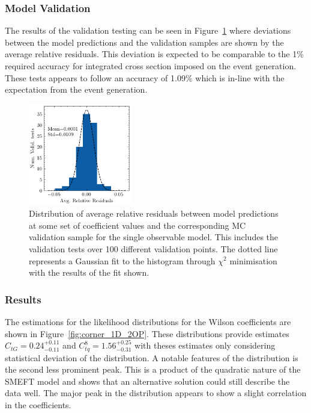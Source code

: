 \documentclass[a4paper,11pt]{article}
\begin{document}
\subsubsection{Model Validation}

The results of the validation testing can be seen in Figure~\ref{fig:residuals_hist_1D} where deviations between the model predictions and the validation samples are shown by the average relative residuals.
This deviation is expected to be comparable to the 1\% required accuracy for integrated cross section imposed on the event generation.
These tests appears to follow an accuracy of 1.09\% which is in-line with the expectation from the event generation.

\begin{figure}[htb]
    \centering
    \includegraphics[width=0.4\textwidth]{./plots/residuals_hist_1D.png}
    \caption{Distribution of average relative residuals between model predictions at some set of coefficient values and the corresponding MC validation sample for the single observable model. This includes the validation tests over 100 different validation points. The dotted line represents a Gaussian fit to the histogram through $\chi^2$ minimisation with the results of the fit shown.}
    \label{fig:residuals_hist_1D}
\end{figure}
\subsubsection{Results}

The estimations for the likelihood distributions for the Wilson coefficients are shown in Figure~\ref{fig:corner_1D_2OP}.
These distributions provide estimates $C_{tG}=0.24^{+0.11}_{-0.11}$ and $C_{tq}^{8}=1.56^{+0.25}_{-0.31}$ with theses estimates only considering statistical deviation of the distribution.
A notable features of the distribution is the second less prominent peak.
This is a product of the quadratic nature of the SMEFT model and shows that an alternative solution could still describe the data well.
The major peak in the distribution appears to show a slight correlation in the coefficients.
\end{document}
